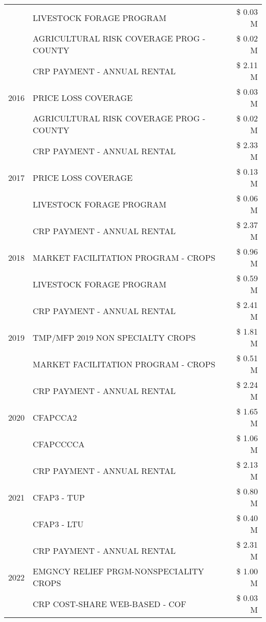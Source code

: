 \begin{tabular}{llr}
 & LIVESTOCK FORAGE PROGRAM & \$ 0.03 M \\
 & AGRICULTURAL RISK COVERAGE PROG - COUNTY & \$ 0.02 M \\
\cline{1-3}
\multirow[t]{3}{*}{2016} & CRP PAYMENT - ANNUAL RENTAL & \$ 2.11 M \\
 & PRICE LOSS COVERAGE & \$ 0.03 M \\
 & AGRICULTURAL RISK COVERAGE PROG - COUNTY & \$ 0.02 M \\
\cline{1-3}
\multirow[t]{3}{*}{2017} & CRP PAYMENT - ANNUAL RENTAL & \$ 2.33 M \\
 & PRICE LOSS COVERAGE & \$ 0.13 M \\
 & LIVESTOCK FORAGE PROGRAM & \$ 0.06 M \\
\cline{1-3}
\multirow[t]{3}{*}{2018} & CRP PAYMENT - ANNUAL RENTAL & \$ 2.37 M \\
 & MARKET FACILITATION PROGRAM - CROPS & \$ 0.96 M \\
 & LIVESTOCK FORAGE PROGRAM & \$ 0.59 M \\
\cline{1-3}
\multirow[t]{3}{*}{2019} & CRP PAYMENT - ANNUAL RENTAL & \$ 2.41 M \\
 & TMP/MFP 2019 NON SPECIALTY CROPS & \$ 1.81 M \\
 & MARKET FACILITATION PROGRAM - CROPS & \$ 0.51 M \\
\cline{1-3}
\multirow[t]{3}{*}{2020} & CRP PAYMENT - ANNUAL RENTAL & \$ 2.24 M \\
 & CFAPCCA2 & \$ 1.65 M \\
 & CFAPCCCCA & \$ 1.06 M \\
\cline{1-3}
\multirow[t]{3}{*}{2021} & CRP PAYMENT - ANNUAL RENTAL & \$ 2.13 M \\
 & CFAP3 - TUP & \$ 0.80 M \\
 & CFAP3 - LTU & \$ 0.40 M \\
\cline{1-3}
\multirow[t]{3}{*}{2022} & CRP PAYMENT - ANNUAL RENTAL & \$ 2.31 M \\
 & EMGNCY RELIEF PRGM-NONSPECIALITY CROPS & \$ 1.00 M \\
 & CRP COST-SHARE WEB-BASED - COF & \$ 0.03 M \\
\cline{1-3}
\bottomrule
\end{tabular}
